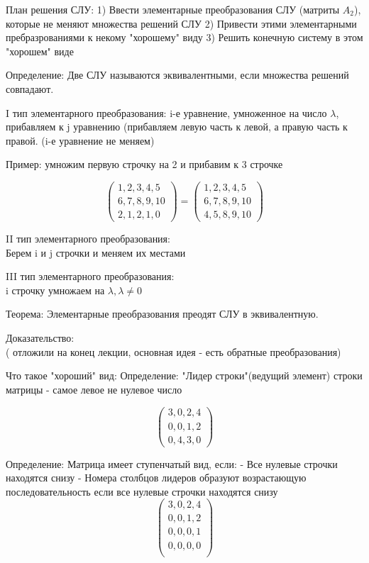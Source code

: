 \documentclass[a4paper]{article}
\begin{document}
План решения СЛУ:
1) Ввести элементарные преобразования СЛУ (матриты $A_2$), которые не меняют множества решений СЛУ
2) Привести этими элементарными пребразрованиями к некому "хорошему" виду
3) Решить конечную систему в этом "хорошем" виде


Определение:
Две СЛУ называются  эквивалентными, если множества решений совпадают.

I тип элементарного преобразования:
i-е уравнение, умноженное на число $\lambda$, прибавляем к j уравнению (прибавляем левую часть к левой, а правую часть к правой. (i-е уравнение не меняем)

Пример: умножим первую строчку на 2 и прибавим к 3 строчке


\begin{equation*}
\begin{pmatrix}
  1, 2, 3, 4, 5 \\
  6, 7, 8, 9, 10\\
  2, 1, 2, 1, 0
\end{pmatrix} = 
\begin{pmatrix}
  1, 2, 3, 4, 5\\
  6, 7, 8, 9, 10\\
  4, 5, 8, 9, 10
\end{pmatrix}
\end{equation*}

II тип элементарного преобразования:\\
Берем i и j строчки и меняем их местами


III тип элементарного преобразования:\\
i строчку умножаем на $\lambda, \lambda \neq 0$


Теорема: Элементарные преобразования преодят СЛУ в эквивалентную.

Доказательство:\\
 ( отложили на конец лекции, основная идея - есть обратные преобразования)


Что такое "хороший" вид:
Определение: "Лидер строки"(ведущий элемент) строки матрицы - самое левое не нулевое число

\begin{equation*}
\begin{pmatrix}
  3 , 0, 2, 4 \\
  0, 0, 1, 2\\
  0, 4, 3, 0
\end{pmatrix}
\end{equation*}



Определение: Матрица имеет ступенчатый вид, если:
- Все нулевые строчки находятся снизу
- Номера столбцов лидеров образуют возрастающую последовательность
если все нулевые строчки находятся снизу
\begin{equation*}
\begin{pmatrix}
  3 , 0, 2, 4 \\
  0, 0, 1, 2\\
  0, 0, 0, 1\\
    0, 0, 0, 0\\
\end{pmatrix}
\end{equation*}
\end{document}
